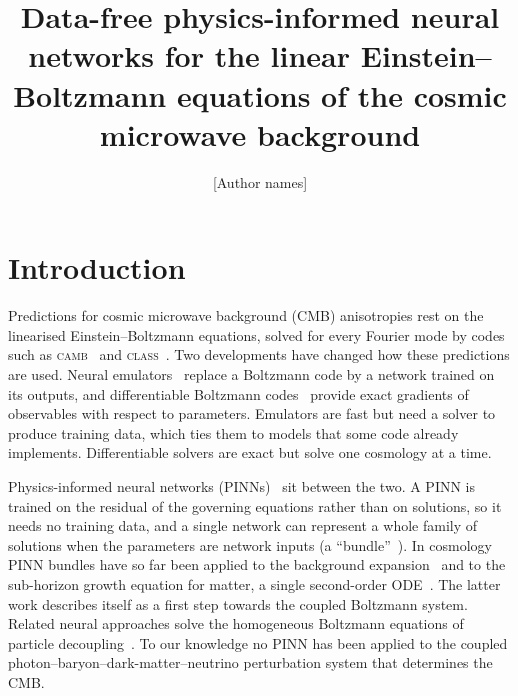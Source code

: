\documentclass[prd,twocolumn,superscriptaddress,nofootinbib,floatfix]{revtex4-2}
\begin{document}
\title{Data-free physics-informed neural networks for the linear Einstein--Boltzmann equations of the cosmic microwave background}

\author{[Author names]}
\affiliation{[Affiliations]}

\begin{abstract}

\end{abstract}

\maketitle

\section{Introduction}

Predictions for cosmic microwave background (CMB) anisotropies rest on the linearised Einstein--Boltzmann equations, solved for every Fourier mode by codes such as \textsc{camb}~\cite{CAMB} and \textsc{class}~\cite{CLASS1,CLASS2}. Two developments have changed how these predictions are used. Neural emulators~\cite{CosmicNet1,CosmicNet2,CosmoPower,CosmoPowerJAX} replace a Boltzmann code by a network trained on its outputs, and differentiable Boltzmann codes~\cite{DISCOEB,SymBoltz,ABCMB} provide exact gradients of observables with respect to parameters. Emulators are fast but need a solver to produce training data, which ties them to models that some code already implements. Differentiable solvers are exact but solve one cosmology at a time.

Physics-informed neural networks (PINNs)~\cite{Lagaris1998,Raissi2019} sit between the two. A PINN is trained on the residual of the governing equations rather than on solutions, so it needs no training data, and a single network can represent a whole family of solutions when the parameters are network inputs (a ``bundle''~\cite{Flamant2020}). In cosmology PINN bundles have so far been applied to the background expansion~\cite{Chantada2023,Chantada2024} and to the sub-horizon growth equation for matter, a single second-order ODE~\cite{GomezBachar2025}. The latter work describes itself as a first step towards the coupled Boltzmann system. Related neural approaches solve the homogeneous Boltzmann equations of particle decoupling~\cite{NBE}. To our knowledge no PINN has been applied to the coupled photon--baryon--dark-matter--neutrino perturbation system that determines the CMB.
\end{document}
